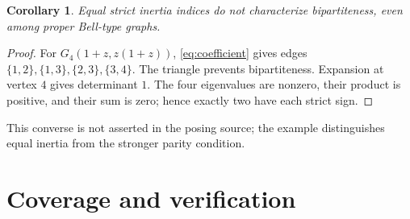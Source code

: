 \documentclass[11pt]{article}
\newtheorem{corollary}[theorem]{Corollary}
\begin{document}
\begin{corollary}\label{cor:converse}
Equal strict inertia indices do not characterize bipartiteness,
even among proper Bell-type graphs.
\end{corollary}
\begin{proof}
For $G_4(1+z,z(1+z))$, \eqref{eq:coefficient} gives edges
$\{1,2\},\{1,3\},\{2,3\},\{3,4\}$. The triangle prevents
bipartiteness. Expansion at vertex $4$ gives determinant $1$.
The four eigenvalues are nonzero, their product is positive, and
their sum is zero; hence exactly two have each strict sign.
\end{proof}
This converse is not asserted in the posing source; the example
distinguishes equal inertia from the stronger parity condition.

\section{Coverage and verification}
\end{document}
